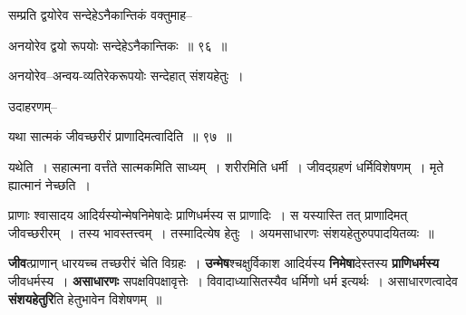 \documentclass[article,12pt,a4paper]{memoir}
\begin{document}
	  \pstart सम्प्रति द्वयोरेव सन्देहेऽनैकान्तिकं वक्तुमाह--
	\pend
        
	  \bigskip
	  \begingroup
	

	  \pstart अनयोरेव द्वयो रूपयोः सन्देहेऽनैकान्तिकः ॥ ९६ ॥
	\pend
      
	  \endgroup
	 

	  \pstart अनयोरेव--अन्वय-व्यतिरेकरूपयोः सन्देहात् संशयहेतुः ।
	\pend
        

	  \pstart उदाहरणम्--
	\pend
        
	  \bigskip
	  \begingroup
	

	  \pstart यथा सात्मकं जीवच्छरीरं प्राणादिमत्वादिति ॥ ९७ ॥
	\pend
      
	  \endgroup
	 

	  \pstart यथेति । सहात्मना वर्त्तंते सात्मकमिति साध्यम् । शरीरमिति धर्मी । जीवद्ग्रहणं धर्मिविशेषणम् । मृते ह्यात्मानं नेच्छति ।
	\pend
        

	  \pstart प्राणाः श्वासादय आदिर्यस्योन्मेषनिमेषादेः प्राणिधर्मस्य स प्राणादिः । स यस्यास्ति तत् प्राणादिमत् जीवच्छरीरम् । तस्य भावस्तत्त्वम् । तस्मादित्येष हेतुः । अयमसाधारणः संशयहेतुरुपपादयितव्यः ॥
	\pend
      
	  \endgroup
	

	  \pstart \textbf{जीव}त्प्राणान् धारयच्च तच्छरीरं चेति विग्रहः । \textbf{उन्मेष}श्चक्षुर्विकाश आदिर्यस्य \textbf{निमेषा}देस्तस्य \textbf{प्राणिधर्मस्य} जीवधर्मस्य । \textbf{असाधारणः} सपक्षविपक्षावृत्तेः । विवादाध्यासितस्यैव धर्मिणो धर्म इत्यर्थः । असाधारणत्वादेव \textbf{संशयहेतुरि}ति हेतुभावेन विशेषणम् ॥
	\pend
	  \bigskip
	  \begingroup
	
\end{document}
